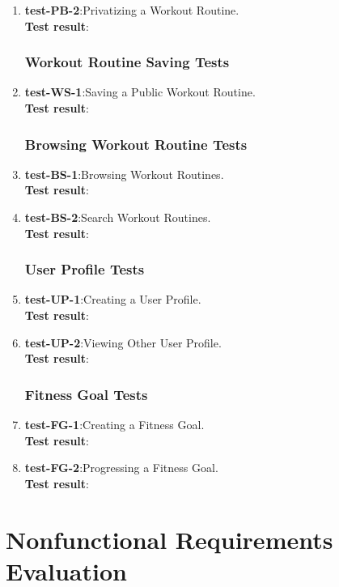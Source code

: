 \documentclass[12pt, titlepage]{article}
\begin{document}
\begin{enumerate}
	\item{\textbf{test-PB-2}}:Privatizing a Workout Routine.\\
	\textbf{Test result}:
	
\subsubsection{Workout Routine Saving Tests}
	\item{\textbf{test-WS-1}}:Saving a Public Workout Routine.\\
	\textbf{Test result}:
	
\subsubsection{Browsing Workout Routine Tests}
	\item{\textbf{test-BS-1}}:Browsing Workout Routines.\\
	\textbf{Test result}:
	
	\item{\textbf{test-BS-2}}:Search Workout Routines.\\
	\textbf{Test result}:
	
\subsubsection{User Profile Tests}
	\item{\textbf{test-UP-1}}:Creating a User Profile.\\
	\textbf{Test result}:
	
	\item{\textbf{test-UP-2}}:Viewing Other User Profile.\\
	\textbf{Test result}:
	
\subsubsection{Fitness Goal Tests}
	\item{\textbf{test-FG-1}}:Creating a Fitness Goal.\\
	\textbf{Test result}:
	
	\item{\textbf{test-FG-2}}:Progressing a Fitness Goal.\\
	\textbf{Test result}:
	
	
\end{enumerate}
\section{Nonfunctional Requirements Evaluation}
\end{document}
